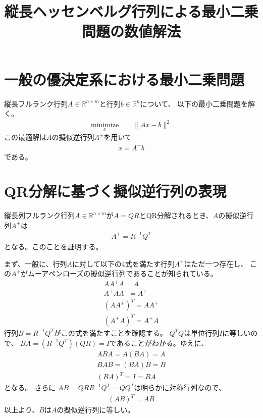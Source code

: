 \documentclass{jarticle}
\title{縦長ヘッセンベルグ行列による最小二乗問題の数値解法}
\begin{document}
\section{一般の優決定系における最小二乗問題}
縦長フルランク行列$A\in \mathbb{R}^{n\times m}$と行列$b\in\mathbb{R}^n$について、
以下の最小二乗問題を解く。
\begin{align}
\underset{x}{\textrm{minimize}} \hspace{2em}
\|Ax - b\|^2
\end{align}
この最適解は$A$の擬似逆行列$A^{+}$を用いて
\begin{align}
x = A^{+}b
\end{align}
である。

\section{QR分解に基づく擬似逆行列の表現}
縦長列フルランク行列$A\in \mathbb{R}^{n\times m}$が$A=QR$とQR分解されるとき、$A$の擬似逆行列$A^{+}$は
\begin{align}
A^{+} = R^{-1}Q^T
\end{align}
となる。このことを証明する。

まず、一般に、行列$A$に対して以下の4式を満たす行列$A^{+}$はただ一つ存在し、
この$A^{+}$がムーアペンローズの擬似逆行列であることが知られている。
\begin{align}
AA^{+}A = A
\\
A^{+}AA^{+} = A^{+}
\\
(AA^{+})^T = AA^{+}
\\
(A^{+}A)^T = A^{+}A
\end{align}
行列$B=R^{-1}Q^T$がこの式を満たすことを確認する。
$Q^TQ$は単位行列$I$に等しいので、
$BA=(R^{-1}Q^T)(QR)=I$であることがわかる。ゆえに、
\begin{align}
ABA = A(BA) = A
\\
BAB = (BA)B = B
\\
(BA)^T = I = BA
\end{align}
となる。
さらに
$AB=QRR^{-1}Q^T=QQ^T$は明らかに対称行列なので、
\begin{align}
(AB)^T = AB
\end{align}
以上より、$B$は$A$の擬似逆行列に等しい。

\newpage
\end{document}
